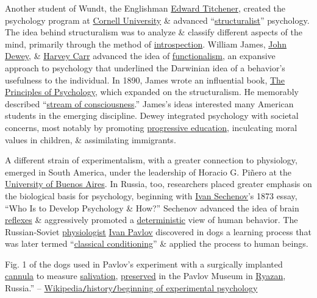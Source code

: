 \documentclass[oneside]{book}
\numberwithin{equation}{section}
\begin{document}
Another student of Wundt, the Englishman \href{https://en.wikipedia.org/wiki/Edward_Titchener}{Edward Titchener}, created the psychology program at \href{https://en.wikipedia.org/wiki/Cornell_University}{Cornell University} \& advanced ``\href{https://en.wikipedia.org/wiki/Structuralism_(psychology)}{structuralist}'' psychology. The idea behind structuralism was to analyze \& classify different aspects of the mind, primarily through the method of \href{https://en.wikipedia.org/wiki/Introspection}{introspection}. William James, \href{https://en.wikipedia.org/wiki/John_Dewey}{John Dewey}, \& \href{https://en.wikipedia.org/wiki/Harvey_Carr}{Harvey Carr} advanced the idea of \href{https://en.wikipedia.org/wiki/Functional_psychology}{functionalism}, an expansive approach to psychology that underlined the Darwinian idea of a behavior's usefulness to the individual. In 1890, James wrote an influential book, \href{https://en.wikipedia.org/wiki/The_Principles_of_Psychology}{The Principles of Psychology}, which expanded on the structuralism. He memorably described ``\href{https://en.wikipedia.org/wiki/Stream_of_consciousness_(psychology)}{stream of consciousness}.'' James's ideas interested many American students in the emerging discipline. Dewey integrated psychology with societal concerns, most notably by promoting \href{https://en.wikipedia.org/wiki/Progressive_education}{progressive education}, inculcating moral values in children, \& assimilating immigrants.

A different strain of experimentalism, with a greater connection to physiology, emerged in South America, under the leadership of Horacio G. Pi\~nero at the \href{https://en.wikipedia.org/wiki/University_of_Buenos_Aires}{University of Buenos Aires}. In Russia, too, researchers placed greater emphasis on the biological basis for psychology, beginning with \href{https://en.wikipedia.org/wiki/Ivan_Sechenov}{Ivan Sechenov}'s 1873 essay, ``Who Is to Develop Psychology \& How?'' Sechenov advanced the idea of brain \href{https://en.wikipedia.org/wiki/Reflexes}{reflexes} \& aggressively promoted a \href{https://en.wikipedia.org/wiki/Determinism}{deterministic} view of human behavior. The Russian-Soviet \href{https://en.wikipedia.org/wiki/Physiologist}{physiologist} \href{https://en.wikipedia.org/wiki/Ivan_Pavlov}{Ivan Pavlov} discovered in dogs a learning process that was later termed ``\href{https://en.wikipedia.org/wiki/Classical_conditioning}{classical conditioning}'' \& applied the process to human beings.

\textsf{Fig. 1 of the dogs used in Pavlov's experiment with a surgically implanted \href{https://en.wikipedia.org/wiki/Cannula}{cannula} to measure \href{https://en.wikipedia.org/wiki/Saliva}{salivation}, \href{https://en.wikipedia.org/wiki/Taxidermy}{preserved} in the Pavlov Museum in \href{https://en.wikipedia.org/wiki/Ryazan}{Ryazan}, Russia.}'' -- \href{https://en.wikipedia.org/wiki/Psychology#Beginning_of_experimental_psychology}{Wikipedia\texttt{/}history\texttt{/}beginning of experimental psychology}
\end{document}
